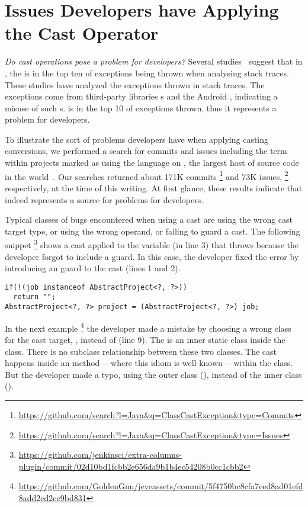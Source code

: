 \section{Issues Developers have Applying the Cast Operator}
\label{sec:casts:issues}

\emph{Do cast operations pose a problem for developers?}
Several studies~\citep{kechagiaUndocumentedUncheckedExceptions2014,coelhoUnveilingExceptionHandling2015,zhitnitskyTop10Exception2016}
suggest that in \java{},
the  is in the top ten of exceptions being thrown when analysing stack traces.
These studies have analyzed the exceptions thrown in stack traces.
The exceptions come from third-party libraries \api{}s and the Android \api{},
indicating a misuse of such \api{}s.
 is in the top 10 of exceptions thrown,
thus it represents a problem for developers.

To illustrate the sort of problems developers have when applying casting conversions,
we performed a search for commits and issues including the term
 within projects marked as using the \java{} language
on \github{},
the largest host of source code in the world~\citep{gousiosLeanGHTorrentGitHub2014}.
Our searches returned about 171K commits%
\footnote{\url{https://github.com/search?l=Java&q=ClassCastException&type=Commits}}
and 73K issues,%
\footnote{\url{https://github.com/search?l=Java&q=ClassCastException&type=Issues}}
respectively, at the time of this writing.
At first glance, these results indicate that  indeed
represents a source for problems for developers.

Typical classes of bugs encountered when using a cast are using the wrong cast target type,
or using the wrong operand, or failing to guard a cast.
The following snippet%
\footnote{\url{https://github.com/jenkinsci/extra-columns-plugin/commit/02d10bd1fcbb2e656da9b1b4ec54208b0cc1cbb2}}
shows a cast applied to the variable  (in line 3) that throws  because the developer forgot to include a guard.
In this case, the developer fixed the error by introducing an  guard to the cast (lines 1 and 2).

\begin{verbatim}
if(!(job instanceof AbstractProject<?, ?>))
  return "";
AbstractProject<?, ?> project = (AbstractProject<?, ?>) job;
\end{verbatim}

In the next example%
\footnote{\url{https://github.com/GoldenGnu/jeveassets/commit/5f4750bc8cfa7eed8ad01efd8add2cd2cc9bd831}}
the developer made a mistake by choosing a wrong class for the cast target,
\ie,  instead of  (line 9).
The  is an inner static class inside the  class.
There is no subclass relationship between these two classes.
The cast happens inside an  method
---where this idiom is well known---
within the  class.
But the developer made a typo, using the outer class (), instead of the inner class ().

